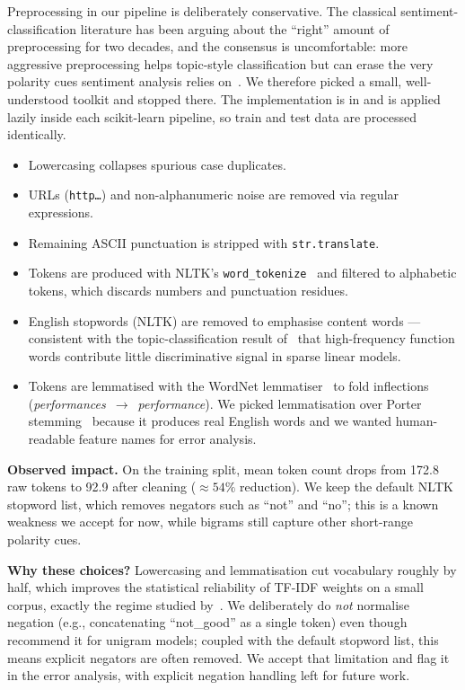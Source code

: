\documentclass[11pt]{article}
\begin{document}
Preprocessing in our pipeline is deliberately conservative. The classical sentiment-classification literature has been arguing about the ``right'' amount of preprocessing for two decades, and the consensus is uncomfortable: more aggressive preprocessing helps topic-style classification but can erase the very polarity cues sentiment analysis relies on~\citep{pang_lee_2008}. We therefore picked a small, well-understood toolkit and stopped there. The implementation is in  and is applied lazily inside each scikit-learn pipeline, so train and test data are processed identically.

\begin{itemize}
  \item Lowercasing collapses spurious case duplicates.
  \item URLs (\texttt{http\dots}) and non-alphanumeric noise are removed via regular expressions.
  \item Remaining ASCII punctuation is stripped with \texttt{str.translate}.
  \item Tokens are produced with NLTK's \texttt{word\_tokenize}~\citep{nltk} and filtered to alphabetic tokens, which discards numbers and punctuation residues.
  \item English stopwords (NLTK) are removed to emphasise content words --- consistent with the topic-classification result of~\citet{joachims_1998} that high-frequency function words contribute little discriminative signal in sparse linear models.
  \item Tokens are lemmatised with the WordNet lemmatiser~\citep{miller_1995} to fold inflections (\textit{performances}~$\to$~\textit{performance}). We picked lemmatisation over Porter stemming~\citep{porter_1980} because it produces real English words and we wanted human-readable feature names for error analysis.
\end{itemize}

\textbf{Observed impact.} On the training split, mean token count drops from 172.8 raw tokens to 92.9 after cleaning ($\approx 54\%$ reduction). We keep the default NLTK stopword list, which removes negators such as ``not'' and ``no''; this is a known weakness we accept for now, while bigrams still capture other short-range polarity cues.

\textbf{Why these choices?} Lowercasing and lemmatisation cut vocabulary roughly by half, which improves the statistical reliability of TF-IDF weights on a small corpus, exactly the regime studied by~\citet{salton_buckley_1988}. We deliberately do \emph{not} normalise negation (e.g., concatenating ``not\_good'' as a single token) even though~\citet{pang_lee_vaithyanathan_2002} recommend it for unigram models; coupled with the default stopword list, this means explicit negators are often removed. We accept that limitation and flag it in the error analysis, with explicit negation handling left for future work.
\end{document}
